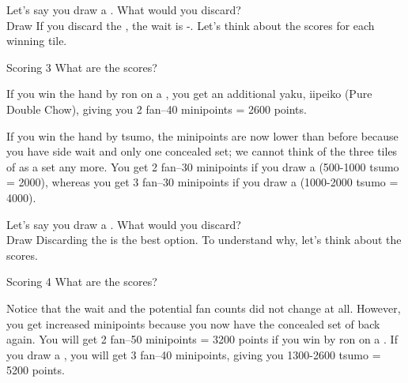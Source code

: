 Let's say you draw a {\large{}}. What would you discard? 
\bp
{}\zhong\zhong\zhong~\\
\hspace{290pt}\footnotesize{Draw}
\ep
If you discard the {\large{}}, the wait is {\large{}-}. Let's think about the scores for each winning tile. 
\begin{itembox}[r]{Scoring 3}
\bp
{}\zhong\zhong\zhong
\ep
\vspace{-10pt} What are the scores?
\end{itembox}

\bigskip
\noindent If you win the hand by {\jap ron} on a {\large{}}, you get an additional {\jap yaku}, {\jap iipeiko} (Pure Double Chow), giving you 2 {\jap fan}--40 minipoints = 2600 points. 

\bigskip
If you win the hand by {\jap tsumo}, the minipoints are now lower than before because you have side wait and only one concealed set; we cannot think of the three tiles of {\large{}} as a set any more. You get 2 {\jap fan}--30 minipoints if you draw a {\large{}} (500-1000 {\jap tsumo} = 2000), whereas you get 3 {\jap fan}--30 minipoints if you draw a {\large{}} (1000-2000 {\jap tsumo} = 4000).

\bigskip

Let's say you draw a {\large{}}. What would you discard? 
\bp
{}\zhong\zhong\zhong~\\
\hspace{290pt}\footnotesize{Draw}
\ep
Discarding the {\large{}} is the best option. To understand why, let's think about the scores. 

\begin{itembox}[r]{Scoring 4}
\bp
{}\zhong\zhong\zhong
\ep
\vspace{-10pt} What are the scores?
\end{itembox}

\bigskip
\noindent Notice that the wait and the potential {\jap fan} counts did not change at all. However, you get increased minipoints because you now have the concealed set of {\large{}} back again. You will get 2 {\jap fan}--50 minipoints = 3200 points if you win by {\jap ron} on a {\large{}}. If you draw a {\large{}}, you will get 3 {\jap fan}--40 minipoints, giving you 1300-2600 {\jap tsumo} = 5200 points. 

